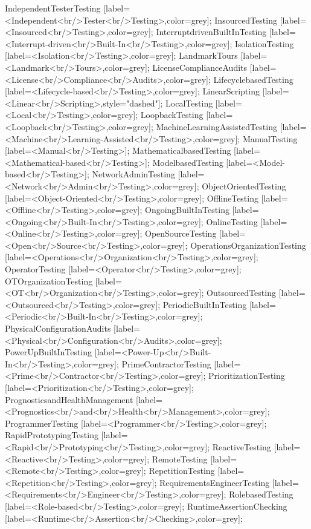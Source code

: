 \documentclass{article}
\begin{document}
{IndependentTesterTesting [label=<Independent<br/>Tester<br/>Testing>,color=grey];
InsourcedTesting [label=<Insourced<br/>Testing>,color=grey];
InterruptdrivenBuiltInTesting [label=<Interrupt-driven<br/>Built-In<br/>Testing>,color=grey];
IsolationTesting [label=<Isolation<br/>Testing>,color=grey];
LandmarkTours [label=<Landmark<br/>Tours>,color=grey];
LicenseComplianceAudits [label=<License<br/>Compliance<br/>Audits>,color=grey];
LifecyclebasedTesting [label=<Lifecycle-based<br/>Testing>,color=grey];
LinearScripting [label=<Linear<br/>Scripting>,style="dashed"];
LocalTesting [label=<Local<br/>Testing>,color=grey];
LoopbackTesting [label=<Loopback<br/>Testing>,color=grey];
MachineLearningAssistedTesting [label=<Machine<br/>Learning-Assisted<br/>Testing>,color=grey];
ManualTesting [label=<Manual<br/>Testing>];
MathematicalbasedTesting [label=<Mathematical-based<br/>Testing>];
ModelbasedTesting [label=<Model-based<br/>Testing>];
NetworkAdminTesting [label=<Network<br/>Admin<br/>Testing>,color=grey];
ObjectOrientedTesting [label=<Object-Oriented<br/>Testing>,color=grey];
OfflineTesting [label=<Offline<br/>Testing>,color=grey];
OngoingBuiltInTesting [label=<Ongoing<br/>Built-In<br/>Testing>,color=grey];
OnlineTesting [label=<Online<br/>Testing>,color=grey];
OpenSourceTesting [label=<Open<br/>Source<br/>Testing>,color=grey];
OperationsOrganizationTesting [label=<Operations<br/>Organization<br/>Testing>,color=grey];
OperatorTesting [label=<Operator<br/>Testing>,color=grey];
OTOrganizationTesting [label=<OT<br/>Organization<br/>Testing>,color=grey];
OutsourcedTesting [label=<Outsourced<br/>Testing>,color=grey];
PeriodicBuiltInTesting [label=<Periodic<br/>Built-In<br/>Testing>,color=grey];
PhysicalConfigurationAudits [label=<Physical<br/>Configuration<br/>Audits>,color=grey];
PowerUpBuiltInTesting [label=<Power-Up<br/>Built-In<br/>Testing>,color=grey];
PrimeContractorTesting [label=<Prime<br/>Contractor<br/>Testing>,color=grey];
PrioritizationTesting [label=<Prioritization<br/>Testing>,color=grey];
PrognosticsandHealthManagement [label=<Prognostics<br/>and<br/>Health<br/>Management>,color=grey];
ProgrammerTesting [label=<Programmer<br/>Testing>,color=grey];
RapidPrototypingTesting [label=<Rapid<br/>Prototyping<br/>Testing>,color=grey];
ReactiveTesting [label=<Reactive<br/>Testing>,color=grey];
RemoteTesting [label=<Remote<br/>Testing>,color=grey];
RepetitionTesting [label=<Repetition<br/>Testing>,color=grey];
RequirementsEngineerTesting [label=<Requirements<br/>Engineer<br/>Testing>,color=grey];
RolebasedTesting [label=<Role-based<br/>Testing>,color=grey];
RuntimeAssertionChecking [label=<Runtime<br/>Assertion<br/>Checking>,color=grey];
}
\end{document}
